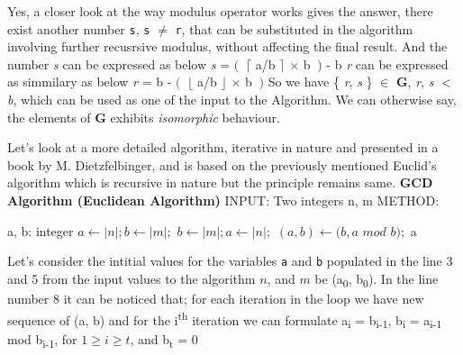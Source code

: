 \documentclass[12pt]{article}
\begin{document}
Yes, a closer look at the way modulus operator works gives the answer, there exist another  number \texttt{s}, \texttt{s} $\neq$ \texttt{r}, that can be substituted in the algorithm involving further recusrsive modulus, without affecting the final result. And the number \textit{s} can be expressed as below
\newline \vspace{0mm} \hspace{4cm} \textit{s} = $ (\ $ $\lceil$ a/b $\rceil$  $\times $ b $\ )$ - b
\newline \textit{r} can be expressed as simmilary as below
\newline \vspace{0mm} \hspace{4cm}\textit{r} = b - $ (\ $ $\lfloor$ a/b $\rfloor$  $\times $ b $\ )$
\newline So we have \{ \textit{r}, \textit{s} \} $\in$ \textbf{G}, \textit{r}, \textit{s} $<$ \textit{b}, which can be used as one of the input to the Algorithm. 
\newline We can otherwise say, the elements of \textbf{G} exhibits \textit{isomorphic }  behaviour.

Let's look at a more detailed algorithm, iterative in nature and presented in a book by M. Dietzfelbinger, and is based on the previously mentioned Euclid's algorithm which is recursive in nature but the principle remains same.
\newline
\newline \textbf{GCD Algorithm (Euclidean Algorithm)}
\newline INPUT: Two integers n, m
\newline METHOD:


\begin{algorithmic}[1]
\STATE a, b: integer
	\STATE $a \gets |n|; b \gets |m|;$
\ELSE
	\STATE $b \gets |m|; a \gets |n|;$
\ENDIF
{} 
	\STATE $(a, b) \leftarrow (b, a  $ $mod $ $b);$
\ENDWHILE
\RETURN a
\end {algorithmic}

Let's consider the intitial values for the variables \texttt{a} and \texttt{b} populated in the line 3 and 5 from the input values to the algorithm $n$, and $m$ be (a\textsubscript{0}, b\textsubscript{0}). In the line number 8 it can be noticed that; for each iteration in the loop we have new sequence of (a, b) and for the i\textsuperscript{th} iteration we can formulate a\textsubscript{i} = b\textsubscript{i-1}, b\textsubscript{i} = a\textsubscript{i-1} mod b\textsubscript{i-1}, for $1 \geq i \geq t$, and b\textsubscript{t} = 0
\end{document}
